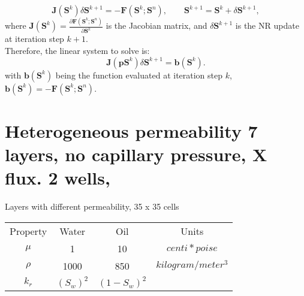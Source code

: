 \documentclass[a4paper,10pt]{report}
\begin{document}
$$\mathbf{J}(\mathbf{S}^k)\delta\mathbf{S}^{k+1}=-\mathbf{F}(\mathbf{S}^k;\mathbf{S}^n),
\qquad \mathbf{S}^{k+1}=\mathbf{S}^k+\delta \mathbf{S}^{k+1},$$
where $\mathbf{J}(\mathbf{S}^k)=\frac{\partial \mathbf{F}(\mathbf{S}^k;\mathbf{S}^n)}{\partial \mathbf{S}^k}$ is the 
Jacobian matrix, and $\delta \mathbf{S}^{k+1}$ is the NR update at iteration step $k+1$.\\
Therefore, the linear system to solve is:\\
\begin{equation}\label{eq:lsS}
\mathbf{J}(\mathbf{pS}^k)\delta \mathbf{S}^{k+1}=\mathbf{b}(\mathbf{S}^k).
\end{equation}
with $\mathbf{b}(\mathbf{S}^k)$ being the function evaluated at iteration step $k$, $\mathbf{b}(\mathbf{S}^k)=-\mathbf{F}(\mathbf{S}^k;\mathbf{S}^n)$.\\



\chapter*{Heterogeneous permeability 7 layers, no capillary pressure, X flux. 2 wells,}
Layers with different permeability, 35 x 35 cells

\begin{table}[!ht]
\centering
\begin{tabular}{ |c|c|c|c|} 
\hline
Property&Water&Oil&Units\\
$\mu$&     1&    10 & $centi*poise$  \\  
$\rho$& 1000& 850& $kilogram/meter^3$\\
$k_r$&$(S_w)^2$&   $(1-S_w)^2$ &  \\
 \hline
\end{tabular}
\label{table:fluid}
\end{table} 
\end{document}
